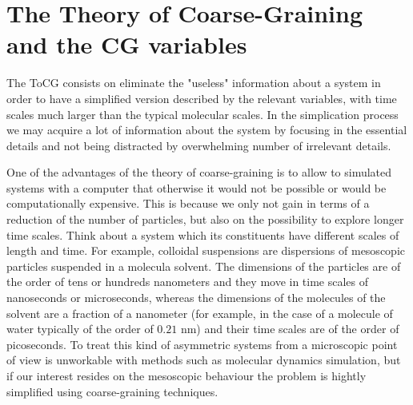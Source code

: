 \documentclass[a4paper,openright,12pt]{book}
\begin{document}

%
%
\section{The Theory of Coarse-Graining and the CG variables}
The ToCG consists on eliminate the "useless" information about a system in order to have a simplified version described by the relevant variables, with time scales much larger than the typical molecular scales. 
In the simplication process we may acquire a lot of information about the system by focusing in the essential details and not being distracted by overwhelming number of irrelevant details.

One of the advantages of the theory of coarse-graining is to allow to simulated systems with a computer that otherwise it would not be possible or would be computationally expensive. 
This is because we only not gain in terms of a reduction of the number of particles, but also on the possibility to explore longer time scales. 
Think about a system which its constituents have different scales of length and time.
For example, colloidal suspensions are dispersions of mesoscopic particles suspended in a molecula solvent.
The dimensions of the particles are of the order of tens or hundreds nanometers and they move in time scales of nanoseconds or microseconds, whereas the dimensions of the molecules of the solvent are a fraction of a nanometer (for example, in the case of a molecule of water typically of the order of $0.21$ nm) and their time scales are of the order of picoseconds. To treat this kind of asymmetric systems from a microscopic point of view is unworkable with methods such as molecular dynamics simulation, but if our interest resides on the mesoscopic behaviour the problem is hightly simplified using coarse-graining techniques.    
\end{document}
